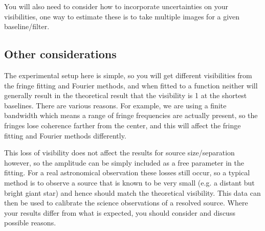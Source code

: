 \documentclass[11pt]{article}
\begin{document}
You will also need to consider how to incorporate uncertainties on your visibilities, one way to estimate these is to take multiple images for a given baseline/filter.

\subsection{Other considerations}

The experimental setup here is simple, so you will get different visibilities from the fringe fitting and Fourier methods, and when fitted to a function neither will generally result in the theoretical result that the visibility is 1 at the shortest baselines. There are various reasons. For example, we are using a finite bandwidth which means a range of fringe frequencies are actually present, so the fringes lose coherence farther from the center, and this will affect the fringe fitting and Fourier methods differently.

This loss of visibility does not affect the results for source size/separation however, so the amplitude can be simply included as a free parameter in the fitting. For a real astronomical observation these losses still occur, so a typical method is to observe a source that is known to be very small (e.g. a distant but bright giant star) and hence should match the theoretical visibility. This data can then be used to calibrate the science observations of a resolved source. Where your results differ from what is expected, you should consider and discuss possible reasons.

\clearpage


\end{document}
